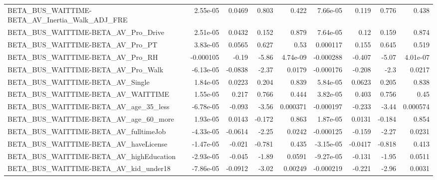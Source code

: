 \begin{tabular}{lrrrrrrrr}
BETA\_BUS\_WAITTIME-BETA\_AV\_Inertia\_Walk\_ADJ\_FRE     &    2.55e-05 &       0.0469 &    0.803 &    0.422 &   7.66e-05 &       0.119 &        0.776 &         0.438 \\
BETA\_BUS\_WAITTIME-BETA\_AV\_Pro\_Drive                &    2.51e-05 &       0.0432 &    0.152 &    0.879 &   7.64e-05 &        0.12 &        0.159 &         0.874 \\
BETA\_BUS\_WAITTIME-BETA\_AV\_Pro\_PT                   &    3.83e-05 &       0.0565 &    0.627 &     0.53 &   0.000117 &       0.155 &        0.645 &         0.519 \\
BETA\_BUS\_WAITTIME-BETA\_AV\_Pro\_RH                   &   -0.000105 &        -0.19 &    -5.86 & 4.74e-09 &  -0.000288 &      -0.407 &        -5.07 &      4.01e-07 \\
BETA\_BUS\_WAITTIME-BETA\_AV\_Pro\_Walk                 &   -6.13e-05 &      -0.0838 &    -2.37 &   0.0179 &  -0.000176 &      -0.208 &         -2.3 &        0.0217 \\
BETA\_BUS\_WAITTIME-BETA\_AV\_Single                   &    1.84e-05 &       0.0223 &    0.204 &    0.839 &   5.84e-05 &      0.0623 &        0.205 &         0.838 \\
BETA\_BUS\_WAITTIME-BETA\_AV\_WAITTIME                 &    1.55e-05 &        0.217 &    0.766 &    0.444 &   3.82e-05 &       0.403 &        0.756 &          0.45 \\
BETA\_BUS\_WAITTIME-BETA\_AV\_age\_35\_less              &   -6.78e-05 &       -0.093 &    -3.56 & 0.000371 &  -0.000197 &      -0.233 &        -3.44 &      0.000574 \\
BETA\_BUS\_WAITTIME-BETA\_AV\_age\_60\_more              &    1.93e-05 &       0.0143 &   -0.172 &    0.863 &   1.87e-05 &      0.0131 &       -0.184 &         0.854 \\
BETA\_BUS\_WAITTIME-BETA\_AV\_fulltimeJob              &   -4.33e-05 &      -0.0614 &    -2.25 &   0.0242 &  -0.000125 &      -0.159 &        -2.27 &        0.0231 \\
BETA\_BUS\_WAITTIME-BETA\_AV\_haveLicense              &   -1.47e-05 &       -0.021 &   -0.781 &    0.435 &  -3.15e-05 &     -0.0417 &       -0.818 &         0.413 \\
BETA\_BUS\_WAITTIME-BETA\_AV\_highEducation            &   -2.93e-05 &       -0.045 &    -1.89 &   0.0591 &  -9.27e-05 &      -0.131 &        -1.95 &        0.0511 \\
BETA\_BUS\_WAITTIME-BETA\_AV\_kid\_under18              &   -7.86e-05 &      -0.0912 &    -3.02 &  0.00249 &  -0.000219 &      -0.221 &        -2.96 &        0.0031 \\

\end{tabular}
